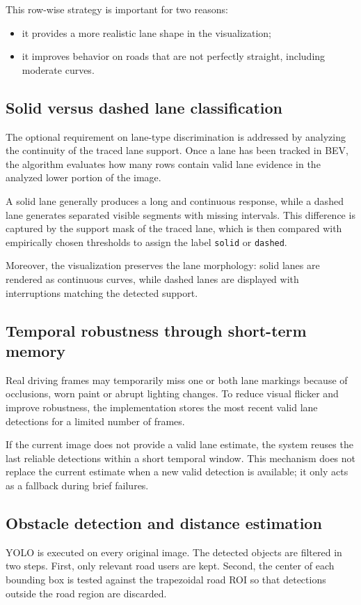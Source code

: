 \documentclass[conference]{IEEEtran}
\begin{document}
This row-wise strategy is important for two reasons:
\begin{itemize}
    \item it provides a more realistic lane shape in the visualization;
    \item it improves behavior on roads that are not perfectly straight, including moderate curves.
\end{itemize}

\subsection{Solid versus dashed lane classification}
The optional requirement on lane-type discrimination is addressed by analyzing the continuity of the traced lane support. Once a lane has been tracked in BEV, the algorithm evaluates how many rows contain valid lane evidence in the analyzed lower portion of the image.

A solid lane generally produces a long and continuous response, while a dashed lane generates separated visible segments with missing intervals. This difference is captured by the support mask of the traced lane, which is then compared with empirically chosen thresholds to assign the label \texttt{solid} or \texttt{dashed}.

Moreover, the visualization preserves the lane morphology: solid lanes are rendered as continuous curves, while dashed lanes are displayed with interruptions matching the detected support.

\subsection{Temporal robustness through short-term memory}
Real driving frames may temporarily miss one or both lane markings because of occlusions, worn paint or abrupt lighting changes. To reduce visual flicker and improve robustness, the implementation stores the most recent valid lane detections for a limited number of frames.

If the current image does not provide a valid lane estimate, the system reuses the last reliable detections within a short temporal window. This mechanism does not replace the current estimate when a new valid detection is available; it only acts as a fallback during brief failures.

\subsection{Obstacle detection and distance estimation}
YOLO is executed on every original image. The detected objects are filtered in two steps. First, only relevant road users are kept. Second, the center of each bounding box is tested against the trapezoidal road ROI so that detections outside the road region are discarded.
\end{document}
